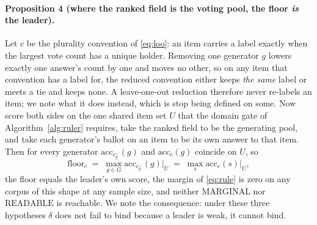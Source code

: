 \documentclass{article}
\begin{document}
\paragraph{Proposition 4 (where the ranked field is the voting pool, the floor \emph{is} the leader).} Let $c$ be the plurality convention of \eqref{eq:loo}: an item carries a label exactly when the largest vote count has a unique holder. Removing one generator $g$ lowers exactly one answer's count by one and moves no other, so on any item that convention has a label for, the reduced convention either keeps \emph{the same} label or meets a tie and keeps none. A leave-one-out reduction therefore never re-labels an item; we note what it does instead, which is stop being defined on some. Now score both sides on the one shared item set $U$ that the domain gate of Algorithm~\ref{alg:ruler} requires, take the ranked field to be the generating pool, and take each generator's ballot on an item to be its own answer to that item. Then for every generator $\mathrm{acc}_{c^-_g}(g)$ and $\mathrm{acc}_{c}(g)$ coincide on $U$, so
\[
  \mathrm{floor}_c \;=\; \max_{g \in G}\mathrm{acc}_{c^-_g}(g)\big|_{U} \;=\; \max_{s}\mathrm{acc}_{c}(s)\big|_{U},
\]
the floor equals the leader's own score, the margin of \eqref{eq:rule} is zero on any corpus of this shape at any sample size, and neither $\mathrm{MARGINAL}$ nor $\mathrm{READABLE}$ is reachable. We note the consequence: under these three hypotheses $\delta$ does not fail to bind because a leader is weak, it cannot bind.
\end{document}
